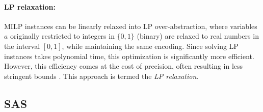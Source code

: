     \fi
    
    
    \paragraph{LP relaxation:}
	MILP instances can be linearly relaxed into LP over-abstraction, where variables $a$ originally restricted to integers in $\{0,1\}$ (binary) are relaxed to real numbers in the interval $[0,1]$, while maintaining the same encoding. Since solving LP instances takes polynomial time, this optimization is significantly more efficient. However, this efficiency comes at the cost of precision, often resulting in less stringent bounds \cite{DivideAndSlide}. This approach is termed the {\em LP relaxation}.
	
	

	
	
	\iffalse
	\subsection{SAS}
	
